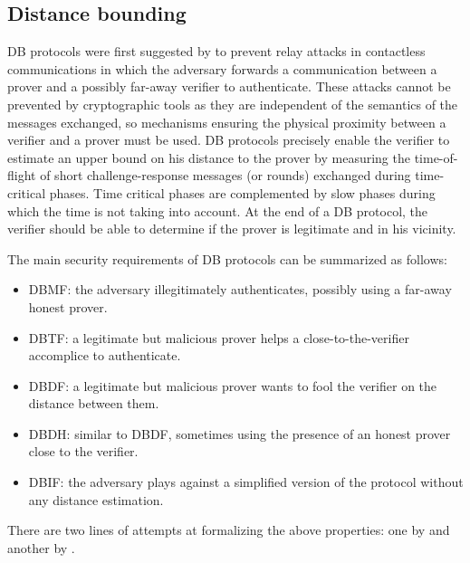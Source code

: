 \subsection{Distance bounding}%
\label{DistanceBounding}

\Ac{DB} protocols were first suggested by \citet{DistanceBounding} to prevent 
relay attacks in contactless communications in which the adversary forwards a 
communication between a prover and a possibly far-away verifier to authenticate. 
These attacks cannot be prevented by cryptographic tools as they are independent 
of the semantics of the messages exchanged, so mechanisms ensuring the physical 
proximity between a verifier and a prover must be used.
\Ac{DB} protocols precisely enable the verifier to estimate an upper bound on his distance to the prover by measuring the time-of-flight of short challenge-response messages (or rounds) exchanged during time-critical phases. 
Time critical phases are complemented by slow phases during which the time is not taking into account.
At the end of a \Ac{DB} protocol, the verifier should be able to determine if the prover is legitimate and in his vicinity.

The main security requirements of \ac{DB} protocols can be summarized as follows:
\begin{itemize}
  \item \acf{DBMF}: the adversary illegitimately authenticates, possibly using 
    a far-away honest prover.
  \item\acf{DBTF}: a legitimate but malicious prover helps a 
    close-to-the-verifier accomplice to authenticate.
  \item \acf{DBDF}: a legitimate but malicious prover wants to fool the 
    verifier on the distance between them.
  \item \acf{DBDH}: similar to \ac{DBDF}, sometimes using the presence of an 
    honest prover close to the verifier.
  \item \acf{DBIF}: the adversary plays against a simplified version of the 
    protocol without any distance estimation.
\end{itemize}
There are two lines of attempts at formalizing the above properties: one by 
\citet{DB-BMV} and another by \citet{DB-DFKO}.

